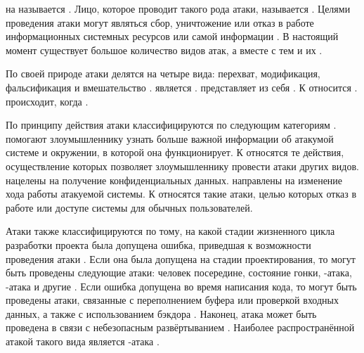 %
 на  называется  .
%
Лицо, которое проводит такого рода атаки, называется  . 
%
Целями проведения атаки могут являться сбор, уничтожение или отказ в работе информационных системных ресурсов или самой информации . 
%
В настоящий момент существует большое количество видов атак, а вместе с тем и их .

%
По своей природе атаки делятся на четыре вида: перехват, модификация, фальсификация и вмешательство . 
%
 является .
%
 представляет из себя .
%
К  относится .
%
 происходит, когда .

%
По принципу действия атаки классифицируются по следующим категориям .
%
 помогают злоумышленнику узнать больше важной информации об атакумой системе и окружении, в которой она функционирует.
%
К  относятся те действия, осуществление которых позволяет злоумышленнику провести атаки других видов. 
%
 нацелены на получение конфиденциальных данных. 
%
 направлены на изменение хода работы атакуемой системы. 
%
К  относятся такие атаки, целью которых отказ в работе или доступе системы для обычных пользователей. 

%
Атаки также классифицируются по тому, на какой стадии жизненного цикла разработки проекта была допущена ошибка, приведшая к возможности проведения атаки .
%
Если она была допущена на стадии проектирования, то могут быть проведены следующие атаки: человек посередине, состояние гонки, -атака, -атака и другие .
%
Если ошибка допущена во время написания кода, то могут быть проведены атаки, связанные с переполнением буфера или проверкой входных данных, а также с использованием бэкдора .
%
Наконец, атака может быть проведена в связи с небезопасным развёртыванием . 
%
Наиболее распространённой атакой такого вида является -атака . 

